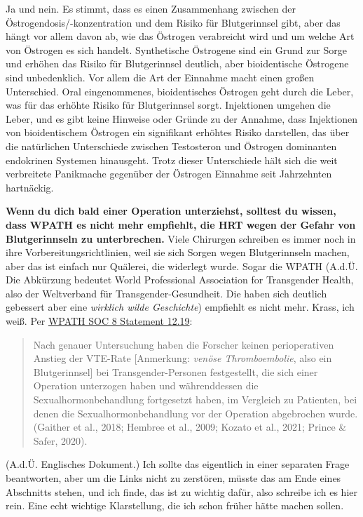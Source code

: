 \documentclass{article}
\begin{document}
Ja und nein. Es stimmt, dass es einen Zusammenhang zwischen der Östrogendosis/-konzentration und dem Risiko für Blutgerinnsel gibt, aber das hängt vor allem davon ab, wie das Östrogen verabreicht wird und um welche Art von Östrogen es sich handelt. Synthetische Östrogene sind ein Grund zur Sorge und erhöhen das Risiko für Blutgerinnsel deutlich, aber bioidentische Östrogene sind unbedenklich. Vor allem die Art der Einnahme macht einen großen Unterschied. Oral eingenommenes, bioidentisches Östrogen geht durch die Leber, was für das erhöhte Risiko für Blutgerinnsel sorgt. Injektionen umgehen die Leber, und es gibt keine Hinweise oder Gründe zu der Annahme, dass Injektionen von bioidentischem Östrogen ein signifikant erhöhtes Risiko darstellen, das über die natürlichen Unterschiede zwischen Testosteron und Östrogen dominanten endokrinen Systemen hinausgeht. Trotz dieser Unterschiede hält sich die weit verbreitete Panikmache gegenüber der Östrogen Einnahme seit Jahrzehnten hartnäckig.

\textbf{Wenn du dich bald einer Operation unterziehst, solltest du wissen, dass WPATH es nicht mehr empfiehlt, die HRT wegen der Gefahr von Blutgerinnseln zu unterbrechen.} Viele Chirurgen schreiben es immer noch in ihre Vorbereitungsrichtlinien, weil sie sich Sorgen wegen Blutgerinnseln machen, aber das ist einfach nur Quälerei, die widerlegt wurde. Sogar die WPATH (A.d.Ü. Die Abkürzung bedeutet World Professional Association for Transgender Health, also der Weltverband für Transgender-Gesundheit. Die haben sich deutlich gebessert aber eine \textit{wirklich wilde Geschichte}) empfiehlt es nicht mehr. Krass, ich weiß. Per \href{https://www.tandfonline.com/doi/pdf/10.1080/26895269.2022.2100644}{WPATH SOC 8 Statement 12.19}: \blockquote{Nach genauer Untersuchung haben die Forscher keinen perioperativen Anstieg der VTE-Rate [Anmerkung: \textit{venöse Thromboembolie}, also ein Blutgerinnsel] bei Transgender-Personen festgestellt, die sich einer Operation unterzogen haben und währenddessen die Sexualhormonbehandlung fortgesetzt haben, im Vergleich zu Patienten, bei denen die Sexualhormonbehandlung vor der Operation abgebrochen wurde.(Gaither et al., 2018; Hembree et al., 2009; Kozato et al., 2021; Prince \& Safer, 2020).} (A.d.Ü. Englisches Dokument.) Ich sollte das eigentlich in einer separaten Frage beantworten, aber um die Links nicht zu zerstören, müsste das am Ende eines Abschnitts stehen, und ich finde, das ist zu wichtig dafür, also schreibe ich es hier rein. Eine echt wichtige Klarstellung, die ich schon früher hätte machen sollen.
\end{document}
